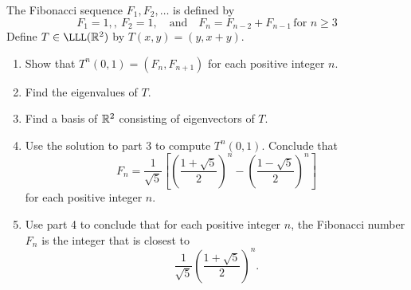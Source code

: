 \begin{exercise}{16}
  The Fibonacci sequence $F_1,F_2,\dots$ is defined by 
  \[F_1=1,,\ F_2=1,\quad \text{and}\quad F_n=F_{n-2}+F_{n-1}\, \text{for }n\geq 3 \]
  Define $T\in\LLL(\R^2)$ by $T(x,y)=(y,x+y)$.
  \begin{enumerate}
      \item Show that $T^n(0,1)=(F_n,F_{n+1})$ for each positive integer $n$.
      \item Find the eigenvalues of $T$.
      \item Find a basis of $\mathbb{R}^2$ consisting of eigenvectors of $T$.
      \item Use the solution to part 3 to compute $T^n(0,1)$. Conclude that 
      \[F_n=\frac{1}{\sqrt{5}}\left[\left(\frac{1+\sqrt{5}}{2}\right)^n-\left(\frac{1-\sqrt{5}}{2}\right)^n\right]\]
      for each positive integer $n$.
      \item Use part 4 to conclude that for each positive integer $n$, the Fibonacci number $F_n$ is the integer that is closest to 
      \[\frac{1}{\sqrt{5}}\left(\frac{1+\sqrt{5}}{2}\right)^n.\]
  \end{enumerate}
\end{exercise}
